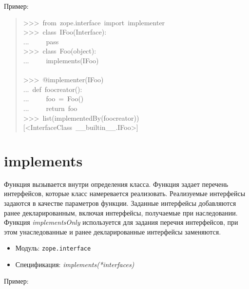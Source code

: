 \documentclass[14pt,a4paper,openany,twoside,final]{extbook}
\providecommand*{\DUroletitlereference}[1]{\textsl{#1}}
\begin{document}
Пример:

\begin{quote}{\ttfamily \raggedright \noindent
>{}>{}>~from~zope.interface~import~implementer\\
>{}>{}>~class~IFoo(Interface):\\
...~~~~~pass\\
>{}>{}>~class~Foo(object):\\
...~~~~~implements(IFoo)\\
~\\
>{}>{}>~@implementer(IFoo)\\
...~def~foocreator():\\
...~~~~~foo~=~Foo()\\
...~~~~~return~foo\\
>{}>{}>~list(implementedBy(foocreator))\\
{[}<InterfaceClass~\_\_builtin\_\_.IFoo>{]}
}
\end{quote}


\section*{implements%
  \label{implements}%
}

Функция вызывается внутри определения класса.  Функция задает перечень
интерфейсов, которые класс намеревается реализовать.  Реализуемые
интерфейсы задаются в качестве параметров функции.  Заданные
интерфейсы добавляются ранее декларированным, включая интерфейсы, получаемые
при наследовании.  Функция \DUroletitlereference{implementsOnly} используется для задания
перечня интерфейсов, при этом унаследованные и ранее декларированные
интерфейсы заменяются.

\begin{itemize}

\item Модуль: \texttt{zope.interface}

\item Спецификация: \DUroletitlereference{implements(*interfaces)}

\end{itemize}

Пример:
\end{document}
